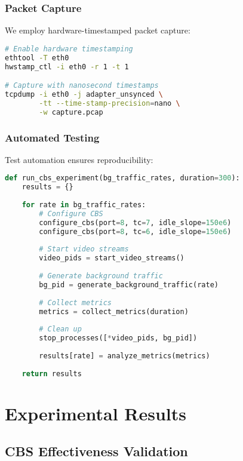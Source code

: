 \documentclass[10pt, journal, compsoc]{IEEEtran}
\begin{document}
\subsubsection{Packet Capture}

We employ hardware-timestamped packet capture:

\begin{lstlisting}[language=bash, caption=Packet Capture Setup]
# Enable hardware timestamping
ethtool -T eth0
hwstamp_ctl -i eth0 -r 1 -t 1

# Capture with nanosecond timestamps
tcpdump -i eth0 -j adapter_unsynced \
        -tt --time-stamp-precision=nano \
        -w capture.pcap
\end{lstlisting}

\subsubsection{Automated Testing}

Test automation ensures reproducibility:

\begin{lstlisting}[language=python, caption=Test Automation Script]
def run_cbs_experiment(bg_traffic_rates, duration=300):
    results = {}
    
    for rate in bg_traffic_rates:
        # Configure CBS
        configure_cbs(port=8, tc=7, idle_slope=150e6)
        configure_cbs(port=8, tc=6, idle_slope=150e6)
        
        # Start video streams
        video_pids = start_video_streams()
        
        # Generate background traffic
        bg_pid = generate_background_traffic(rate)
        
        # Collect metrics
        metrics = collect_metrics(duration)
        
        # Clean up
        stop_processes([*video_pids, bg_pid])
        
        results[rate] = analyze_metrics(metrics)
    
    return results
\end{lstlisting}

\section{Experimental Results}
\label{sec:results}

\subsection{CBS Effectiveness Validation}
\end{document}
